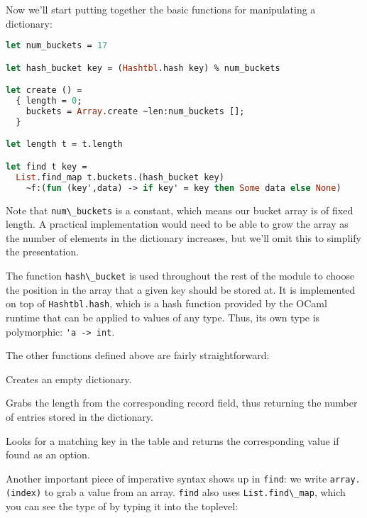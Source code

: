 Now we'll start putting together the basic functions for manipulating a
dictionary:

\begin{lstlisting}[language=Caml]
let num_buckets = 17

let hash_bucket key = (Hashtbl.hash key) % num_buckets

let create () =
  { length = 0;
    buckets = Array.create ~len:num_buckets [];
  }

let length t = t.length

let find t key =
  List.find_map t.buckets.(hash_bucket key)
    ~f:(fun (key',data) -> if key' = key then Some data else None)
\end{lstlisting}

Note that \passthrough{\lstinline!num\_buckets!} is a constant, which
means our bucket array is of fixed length. A practical implementation
would need to be able to grow the array as the number of elements in the
dictionary increases, but we'll omit this to simplify the presentation.

The function \passthrough{\lstinline!hash\_bucket!} is used throughout
the rest of the module to choose the position in the array that a given
key should be stored at. It is implemented on top of
\passthrough{\lstinline!Hashtbl.hash!}, which is a hash function
provided by the OCaml runtime that can be applied to values of any type.
Thus, its own type is polymorphic: \passthrough{\lstinline!'a -> int!}.

The other functions defined above are fairly straightforward:

\begin{description}
\tightlist
\item[\texttt{create}]
Creates an empty dictionary.
\item[\texttt{length}]
Grabs the length from the corresponding record field, thus returning the
number of entries stored in the dictionary.
\item[\texttt{find}]
Looks for a matching key in the table and returns the corresponding
value if found as an option.
\end{description}

Another important piece of imperative syntax shows up in
\passthrough{\lstinline!find!}: we write
\passthrough{\lstinline!array.(index)!} to grab a value from an array.
\passthrough{\lstinline!find!} also uses
\passthrough{\lstinline!List.find\_map!}, which you can see the type of
by typing it into the toplevel:

